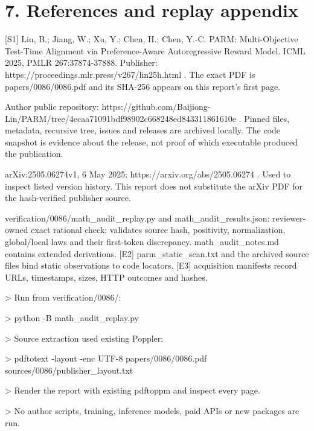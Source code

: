 \documentclass[10pt]{article}
\begin{document}
\section*{7. References and replay appendix}
[S1] Lin, B.; Jiang, W.; Xu, Y.; Chen, H.; Chen, Y.-C. PARM: Multi-Objective Test-Time Alignment via Preference-Aware Autoregressive Reward Model. ICML 2025, PMLR 267:37874-37888. Publisher: https://proceedings.mlr.press/v267/lin25h.html . The exact PDF is papers/0086/0086.pdf and its SHA-256 appears on this report’s first page.\par
[S2] Author public repository: https://github.com/Baijiong-Lin/PARM/tree/4ecaa71091bdf98902c668248ed843311861610e . Pinned files, metadata, recursive tree, issues and releases are archived locally. The code snapshot is evidence about the release, not proof of which executable produced the publication.\par
[S3] arXiv:2505.06274v1, 6 May 2025: https://arxiv.org/abs/2505.06274 . Used to inspect listed version history. This report does not substitute the arXiv PDF for the hash-verified publisher source.\par
[E1] verification/0086/math\_audit\_replay.py and math\_audit\_results.json: reviewer-owned exact rational check; validates source hash, positivity, normalization, global/local laws and their first-token discrepancy. math\_audit\_notes.md contains extended derivations. [E2] parm\_static\_scan.txt and the archived source files bind static observations to code locators. [E3] acquisition manifests record URLs, timestamps, sizes, HTTP outcomes and hashes.\par
> Run from verification/0086/:\par
> python -B math\_audit\_replay.py\par
> Source extraction used existing Poppler:\par
> pdftotext -layout -enc UTF-8 papers/0086/0086.pdf sources/0086/publisher\_layout.txt\par
> Render the report with existing pdftoppm and inspect every page.\par
> No author scripts, training, inference models, paid APIs or new packages are run.\par
\end{document}
